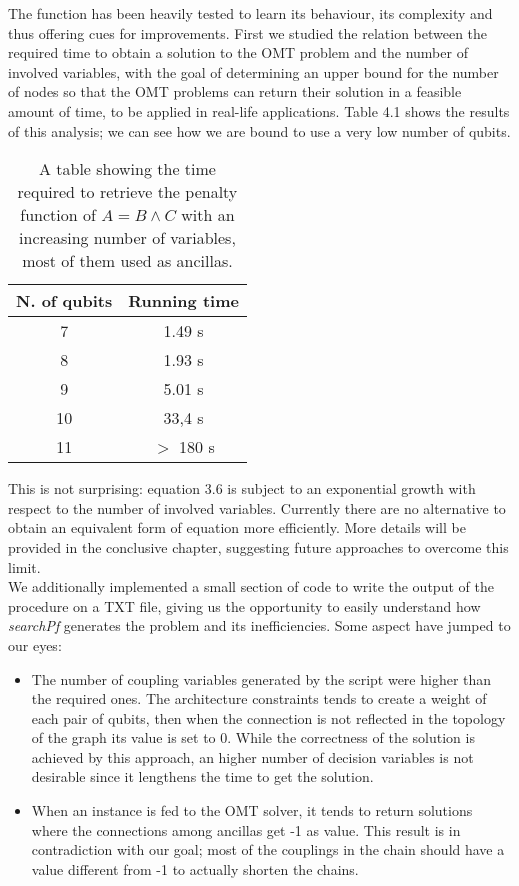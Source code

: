 The function has been heavily tested to learn its behaviour, its complexity and thus offering cues for improvements. First we studied the relation between the required time to obtain a solution to the OMT problem and the number of involved variables, with the goal of determining an upper bound for the number of nodes so that the OMT problems can return their solution in a feasible amount of time, to be applied in real-life applications. Table 4.1 shows the results of this analysis; we can see how we are bound to use a very low number of qubits.
\begin{table}[]
\centering
\begin{tabular}{|c|c|}
\hline
\rowcolor[HTML]{FFCC67} 
N. of qubits & Running time \\ \hline
7            & 1.49 s       \\ \hline
8            & 1.93 s       \\ \hline
9            & 5.01 s       \\ \hline
10           & 33,4 s       \\ \hline
11           & $>$ 180 s      \\ \hline
\end{tabular}
\caption{A table showing the time required to retrieve the penalty function of $A = B \wedge C$ with an increasing number of variables, most of them used as ancillas.}
\label{tab:my-table}
\end{table}
This is not surprising: equation 3.6 is subject to an exponential growth with respect to the number of involved variables. Currently there are no alternative to obtain an equivalent form of equation more efficiently. More details will be provided in the conclusive chapter, suggesting future approaches to overcome this limit. \\
We additionally implemented a small section of code to write the output of the procedure on a TXT file, giving us the opportunity to easily understand how \textit{searchPf} generates the problem and its inefficiencies. Some aspect have jumped to our eyes:

\begin{itemize}
    \item The number of coupling variables generated by the script were higher than the required ones. The architecture constraints tends to create a weight of each pair of qubits, then when the connection is not reflected in the topology of the graph its value is set to 0. While the correctness of the solution is achieved by this approach, an higher number of decision variables is not desirable since it lengthens the time to get the solution.
    \item When an instance is fed to the OMT solver, it tends to return solutions where the connections among ancillas get -1 as value. This result is in contradiction with our goal; most of the couplings in the chain should have a value different from -1 to actually shorten the chains.
\end{itemize}

\newpage

